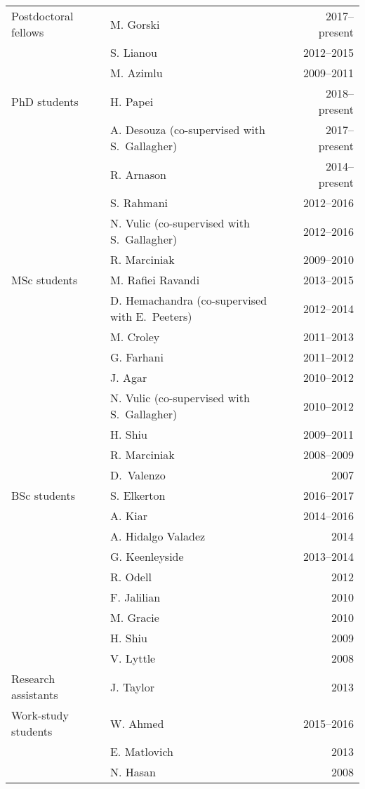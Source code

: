\begin{tabularx}{\textwidth}{p{5cm}Xr}
Postdoctoral fellows 
& M. Gorski & 2017--present\\
& S. Lianou & 2012--2015\\
& M. Azimlu & 2009--2011\\
PhD students 
& H. Papei &  2018--present \\
& A. Desouza (co-supervised with S.\ Gallagher) & 2017--present \\
&  R. Arnason & 2014--present\\
&S. Rahmani& 2012--2016 \\
&N. Vulic (co-supervised with S.\ Gallagher) & 2012--2016 \\
&R. Marciniak & 2009--2010 \\
MSc students 
& M. Rafiei Ravandi& 2013--2015\\
& D. Hemachandra (co-supervised with E.\ Peeters)& 2012--2014\\
& M. Croley& 2011--2013\\
& G. Farhani& 2011--2012\\
 & J. Agar& 2010--2012\\
& N. Vulic (co-supervised with S.\ Gallagher)& 2010--2012\\
& H. Shiu& 2009--2011\\
& R. Marciniak& 2008--2009\\
& D.\ Valenzo& 2007\\
BSc students
& S. Elkerton&  2016--2017\\
& A. Kiar & 2014--2016\\
& A. Hidalgo Valadez & 2014\\
& G. Keenleyside& 2013--2014\\
& R. Odell& 2012\\
& F. Jalilian& 2010\\
& M. Gracie& 2010\\
& H. Shiu& 2009\\
& V. Lyttle& 2008\\
Research assistants 
& J. Taylor& 2013\\
Work-study students
& W. Ahmed & 2015--2016\\
& E. Matlovich& 2013\\
& N. Hasan& 2008\\
\end{tabularx}
